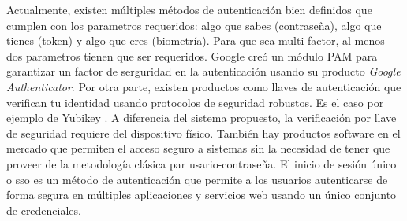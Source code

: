 Actualmente, existen múltiples métodos de autenticación bien definidos que cumplen con los parametros requeridos: algo que sabes
(contraseña), algo que tienes (token) y algo que eres (biometría). Para que sea multi factor, al menos dos parametros tienen que
ser requeridos. Google creó un módulo PAM \cite{noauthor_googlegoogle-authenticator-libpam_2021} para garantizar un factor de 
serguridad en la autenticación usando su producto \textit{Google Authenticator}. Por otra parte, existen productos como llaves
de autenticación que verifican tu identidad usando protocolos de seguridad robustos. Es el caso por ejemplo de Yubikey 
\cite{noauthor_yubikey_nodate}. A diferencia del sistema propuesto, la verificación por llave de seguridad requiere del dispositivo
físico. También hay productos software en el mercado que permiten el acceso seguro a sistemas sin la necesidad de tener que 
proveer de la metodología clásica par usario-contraseña. El inicio de sesión único o \acrfull{sso} \cite{noauthor_single_nodate}
es un método de autenticación que permite a los usuarios autenticarse de forma segura en múltiples aplicaciones y servicios web 
usando un único conjunto de credenciales.



